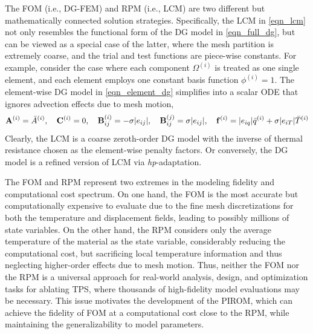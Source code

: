The FOM (i.e., DG-FEM) and RPM (i.e., LCM) are two different but mathematically connected solution strategies. Specifically, the LCM in \cref{eqn_lcm} not only resembles the functional form of the DG model in \cref{eqn_full_dg}, but can be viewed as a special case of the latter, where the mesh partition is extremely coarse, and the trial and test functions are piece-wise constants. For example, consider the case where each component $\Omega^{(i)}$ is treated as one single element, and each element employs one constant basis function $\phi^{(i)}=1$. The element-wise DG model in \cref{eqn_element_dg} simplifies into a scalar ODE that ignores advection effects due to mesh motion,
\begin{equation}
    \mathbf{A}^{(i)} = \bar{A}^{(i)},\quad \mathbf{C}^{(i)} = 0, \quad\mathbf{B}^{(i)}_{ij} = -\sigma|e_{ij}|,\quad \mathbf{B}^{(j)}_{ij}=\sigma|e_{ij}|,\quad \mathbf{f}^{(i)} = |e_{iq}|\bar{q}^{(i)} + \sigma|e_{iT}|\bar{T}^{(i)}
\end{equation}
Clearly, the LCM is a coarse zeroth-order DG model with the inverse of thermal resistance chosen as the element-wise penalty factors. Or conversely, the DG model is a refined version of LCM via \textit{hp}-adaptation.

The FOM and RPM represent two extremes in the modeling fidelity and computational cost spectrum. On one hand, the FOM is the most accurate but computationally expensive to evaluate due to the fine mesh discretizations for both the temperature and displacement fields, leading to possibly millions of state variables. On the other hand, the RPM considers only the average temperature of the material as the state variable, considerably reducing the computational cost, but sacrificing local temperature information and thus neglecting higher-order effects due to mesh motion. Thus, neither the FOM nor the RPM is a universal approach for real-world analysis, design, and optimization tasks for ablating TPS, where thousands of high-fidelity model evaluations may be necessary. This issue motivates the development of the PIROM, which can achieve the fidelity of FOM at a computational cost close to the RPM, while maintaining the generalizability to model parameters.